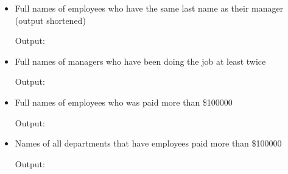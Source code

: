 \documentclass{assignment}
\begin{document}
\begin{itemize}[noitemsep]
        
        \vfill
        \newpage
        Output:
        
    \item Full names of employees who have the same last name as
        their manager (output shortened)
        
        Output:
        
    \item Full names of managers who have been doing the job at least twice
        
        Output:
        
    \item Full names of employees who was paid more than \$100000
        
        Output:
        
    \item Names of all departments that have employees paid more than \$100000
        
        Output:
        
\end{itemize}
\end{document}
